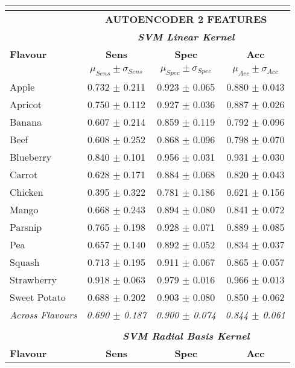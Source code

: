 \documentclass[authoryear]{elsarticle}
\begin{document}
\begin{tabular}{lccc}
    \multicolumn{4}{c}{}\\
    \toprule
          & \multicolumn{3}{c}{\textbf{AUTOENCODER 2 FEATURES}} \\
          & \multicolumn{3}{c}{\textit{\textbf{SVM Linear Kernel}}}\\
    \midrule
    \textbf{Flavour} & \textbf{Sens} & \textbf{Spec} & \textbf{Acc}\\
    & $\mu_{Sens} \pm \sigma_{Sens}$ & $\mu_{Spec} \pm \sigma_{Spec}$ & $\mu_{Acc} \pm \sigma_{Acc}$ \\
    \midrule
    Apple 		 & 0.732 $\pm$ 0.211 & 0.923 $\pm$ 0.065 & 0.880 $\pm$ 0.043 \\
    Apricot 	 & 0.750 $\pm$ 0.112 & 0.927 $\pm$ 0.036 & 0.887 $\pm$ 0.026 \\
    Banana 		 & 0.607 $\pm$ 0.214 & 0.859 $\pm$ 0.119 & 0.792 $\pm$ 0.096 \\
    Beef 		 & 0.608 $\pm$ 0.252 & 0.868 $\pm$ 0.096 & 0.798 $\pm$ 0.070 \\
    Blueberry  	 & 0.840 $\pm$ 0.101 & 0.956 $\pm$ 0.031 & 0.931 $\pm$ 0.030 \\
    Carrot 		 & 0.628 $\pm$ 0.171 & 0.884 $\pm$ 0.068 & 0.820 $\pm$ 0.043 \\
    Chicken  	 & 0.395 $\pm$ 0.322 & 0.781 $\pm$ 0.186 & 0.621 $\pm$ 0.156 \\
    Mango 		 & 0.668 $\pm$ 0.243 & 0.894 $\pm$ 0.080 & 0.841 $\pm$ 0.072 \\
    Parsnip 	 & 0.765 $\pm$ 0.198 & 0.928 $\pm$ 0.071 & 0.889 $\pm$ 0.085 \\
    Pea 		 & 0.657 $\pm$ 0.140 & 0.892 $\pm$ 0.052 & 0.834 $\pm$ 0.037 \\
    Squash 		 & 0.713 $\pm$ 0.195 & 0.911 $\pm$ 0.067 & 0.865 $\pm$ 0.057 \\
    Strawberry 	 & 0.918 $\pm$ 0.063 & 0.979 $\pm$ 0.016 & 0.966 $\pm$ 0.013 \\
    Sweet Potato & 0.688 $\pm$ 0.202 & 0.903 $\pm$ 0.080 & 0.850 $\pm$ 0.062 \\
    \midrule
    \textit{Across Flavours} & \textit{0.690 $\pm$ 0.187} & \textit{0.900 $\pm$ 0.074} & \textit{0.844 $\pm$ 0.061} \\
    \midrule
    \multicolumn{4}{c}{}\\
    \midrule
    & \multicolumn{3}{c}{\textit{\textbf{SVM Radial Basis Kernel}}}\\
    \midrule
    \textbf{Flavour} & \textbf{Sens} & \textbf{Spec} & \textbf{Acc}\\

\end{tabular}
\end{document}

